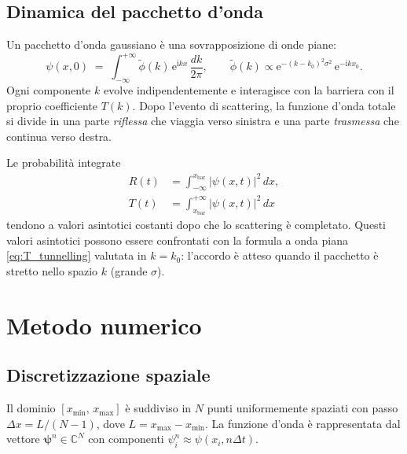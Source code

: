 \documentclass[12pt, a4paper]{article}
\newcommand{\dt}{\Delta t}
\newcommand{\dx}{\Delta x}
\newcommand{\ii}{\mathrm{i}}          %
\newcommand{\ee}{\mathrm{e}}          %
\begin{document}
\subsection{Dinamica del pacchetto d'onda}

Un pacchetto d'onda gaussiano è una sovrapposizione di onde piane:
\begin{equation}
  \psi(x,0) \;=\; \int_{-\infty}^{+\infty}
  \tilde{\phi}(k)\,\ee^{\ii kx}\,\frac{dk}{2\pi},
  \qquad
  \tilde{\phi}(k) \propto \ee^{-(k-k_0)^2\sigma^2}\,\ee^{-\ii k x_0}.
\end{equation}
Ogni componente $k$ evolve indipendentemente e interagisce con la
barriera con il proprio coefficiente $T(k)$.  Dopo l'evento di
scattering, la funzione d'onda totale si divide in una parte
\emph{riflessa} che viaggia verso sinistra e una parte
\emph{trasmessa} che continua verso destra.

Le probabilità integrate
\begin{align}
  R(t) &= \int_{-\infty}^{x_\text{bar}} |\psi(x,t)|^2\,dx, \\
  T(t) &= \int_{x_\text{bar}}^{+\infty} |\psi(x,t)|^2\,dx
\end{align}
tendono a valori asintotici costanti dopo che lo scattering è
completato.  Questi valori asintotici possono essere confrontati con
la formula a onda piana \eqref{eq:T_tunnelling} valutata in $k = k_0$:
l'accordo è atteso quando il pacchetto è stretto nello spazio $k$
(grande $\sigma$).

\section{Metodo numerico}

\subsection{Discretizzazione spaziale}

Il dominio $[x_\text{min},\, x_\text{max}]$ è suddiviso in $N$ punti
uniformemente spaziati con passo $\dx = L/(N-1)$, dove
$L = x_\text{max} - x_\text{min}$.  La funzione d'onda è rappresentata
dal vettore $\boldsymbol{\psi}^n \in \mathbb{C}^N$ con componenti
$\psi_i^n \approx \psi(x_i, n\dt)$.
\end{document}
